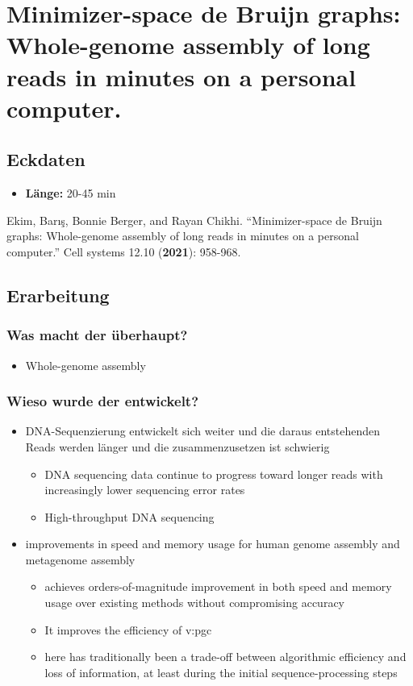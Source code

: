 \documentclass[main.tex]{subfiles}
\begin{document}
\section{Minimizer-space de Bruijn graphs: Whole-genome assembly of long reads in minutes on a personal computer.}
\subsection{Eckdaten}
\begin{itemize}
    \item \textbf{Länge:} 20-45 min
\end{itemize}  
Ekim, Barış, Bonnie Berger, and Rayan Chikhi. “Minimizer-space de Bruijn graphs: Whole-genome assembly of long reads in minutes on a personal computer.” Cell systems 12.10 (\textbf{2021}): 958-968. 
\subsection{Erarbeitung}
\subsubsection{Was macht der überhaupt?} 
\begin{itemize}
    \item Whole-genome assembly 
\end{itemize}
\subsubsection{Wieso wurde der entwickelt?}  
\begin{itemize}
    \item DNA-Sequenzierung entwickelt sich weiter und die daraus entstehenden Reads werden länger und die zusammenzusetzen ist schwierig 
    \begin{itemize}
        \item DNA sequencing data continue to progress toward longer reads with increasingly lower sequencing error rates
        \item High-throughput DNA sequencing
    \end{itemize}
    \item improvements in speed and memory usage for human genome assembly and metagenome assembly 
    \begin{itemize}
        \item achieves orders-of-magnitude improvement in both speed and memory usage over existing methods without compromising accuracy
        \item It improves the efficiency of \gls{v:pgc}
        \item here has traditionally been a trade-off between algorithmic efficiency and loss of information, at least during the initial sequence-processing steps
    \end{itemize}
\end{itemize} 
\end{document}
